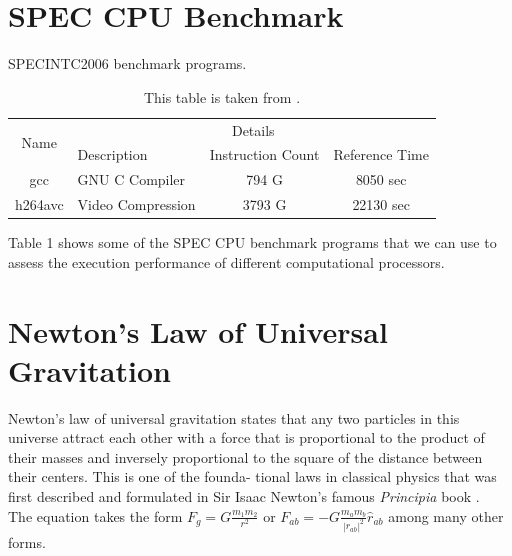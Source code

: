 \documentclass{article}
\begin{document}
\section*{SPEC CPU Benchmark}
\begin{table}[htbp]
    \centering
    \caption{SPECINTC2006 benchmark programs.}
    \begin{tabular}{|c|ccc|}
        \hline
        \multirow{2}{*}{Name} & \multicolumn{3}{c|}{Details}                                                                     \\ \cline{2-4} 
                              & \multicolumn{1}{l|}{Description}       & \multicolumn{1}{c|}{Instruction Count} & Reference Time \\ \hline
        gcc                   & \multicolumn{1}{l|}{GNU C Compiler}    & \multicolumn{1}{c|}{794 G}             & 8050 sec       \\ \hline
        h264avc               & \multicolumn{1}{l|}{Video Compression} & \multicolumn{1}{c|}{3793 G}            & 22130 sec      \\ \hline
    \end{tabular}
    \caption*{This table is taken from \cite{1}.}
\end{table}
Table 1 shows some of the SPEC CPU benchmark programs that we can use to assess
the execution performance of different computational processors.
\section*{Newton’s Law of Universal Gravitation}
Newton’s law of universal gravitation states that any two particles in this universe attract
each other with a force that is proportional to the product of their masses and inversely
proportional to the square of the distance between their centers. This is one of the founda-
tional laws in classical physics that was first described and formulated in Sir Isaac Newton’s
famous \textit{Principia} book \cite{2}.
\\

The equation takes the form $F_g = G\frac{m_1m_2}{r^2}$ or $F_{ab} = -G\frac{m_am_b}{|r_{ab}|^2}\hat{r}_{ab}$ among many other
forms.
\end{document}
